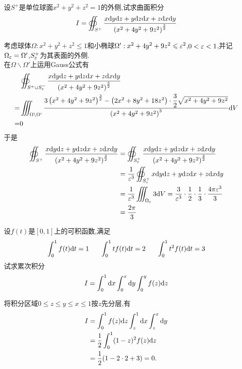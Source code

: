\documentclass{ctexart}
\begin{document}
\begin{problem}[4.(12\songti{分})]
    设$S^+$是单位球面$x^2+y^2+z^2=1$的外侧,试求曲面积分
    \[I=\oiint_{S^+}\dfrac{x\mathrm{d} y\mathrm{d} z+y\mathrm{d} z\mathrm{d} x+z\mathrm{d} x\mathrm{d} y}{\left(x^2+4y^2+9z^2\right)^{\frac32}}\]  
\end{problem}
\begin{solution}
    考虑球体$\Omega:x^2+y^2+z^2\leqslant 1$和小椭球$\Omega':x^2+4y^2+9z^2\leqslant\varepsilon^2$,$0<\varepsilon<1$,并记$\Omega_\varepsilon=\Omega'$,$S_\varepsilon^+$为其表面的外侧.\\
    在$\Omega\backslash\Omega'$上运用Gauss公式有
    \[\begin{aligned}
        &\oiint_{S^+\cup S_\varepsilon^-}\dfrac{x\mathrm{d} y\mathrm{d} z+y\mathrm{d} z\mathrm{d} x+z\mathrm{d} x\mathrm{d} y}{\left(x^2+4y^2+9z^2\right)^{\frac32}}\\
        =&\iiint_{\Omega\backslash\Omega'}\dfrac{3\left(x^2+4y^2+9z^2\right)^{\frac32}-\left(2x^2+8y^2+18z^2\right)\cdot\dfrac{3}{2}\sqrt{x^2+4y^2+9z^2}}{\left(x^2+4y^2+9z^2\right)^3}\mathrm{d} V \\
        =&0
    \end{aligned}\]
    于是
    \[\begin{aligned}
        \oiint_{S^+}\dfrac{x\mathrm{d} y\mathrm{d} z+y\mathrm{d} z\mathrm{d} x+z\mathrm{d} x\mathrm{d} y}{\left(x^2+4y^2+9z^2\right)^{\frac32}}
        &= \oiint_{S_\varepsilon^+}\dfrac{x\mathrm{d} y\mathrm{d} z+y\mathrm{d} z\mathrm{d} x+z\mathrm{d} x\mathrm{d} y}{\left(x^2+4y^2+9z^2\right)^{\frac32}} \\
        &= \dfrac{1}{\varepsilon^3}\oiint_{S_\varepsilon^+}x\mathrm{d} y\mathrm{d} z+y\mathrm{d} z\mathrm{d} x+z\mathrm{d} x\mathrm{d} y \\
        &= \dfrac{1}{\varepsilon^3}\iiint_{\Omega_\varepsilon}3\mathrm{d} V = \dfrac{3}{\varepsilon^3}\cdot\dfrac{1}{2}\cdot\dfrac{1}{3}\cdot\dfrac{4\pi\varepsilon^3}{3} \\
        &= \dfrac{2\pi}{3}
    \end{aligned}\]

\end{solution}
\begin{problem}[5.(12\songti{分})]
    设$f(t)$是$[0,1]$上的可积函数,满足
    \[\int_0^1f(t)\di t=1\ \ \ \ \ \int_0^1tf(t)\di t=2\ \ \ \ \ \int_0^1t^2f(t)\di t=3\]
    试求累次积分
    \[I=\int_0^1\mathrm{d} x\int_0^x\mathrm{d} y\int_0^yf(z)\mathrm{d} z\]

\end{problem}
\begin{solution}
将积分区域$0\leqslant z\leqslant y\leqslant x\leqslant1$按$z$先分层,有
    \[\begin{aligned}
        I&=\int_0^1 f(z)\mathrm{d} z\int_z^1\mathrm{d} x\int_z^x\mathrm{d} y\\
        &=\dfrac12\int_0^1(1-z)^2f(z)\mathrm{d} z\\
        &=\dfrac12(1-2\cdot2+3)=0.
    \end{aligned}\]
\end{solution}
\end{document}
